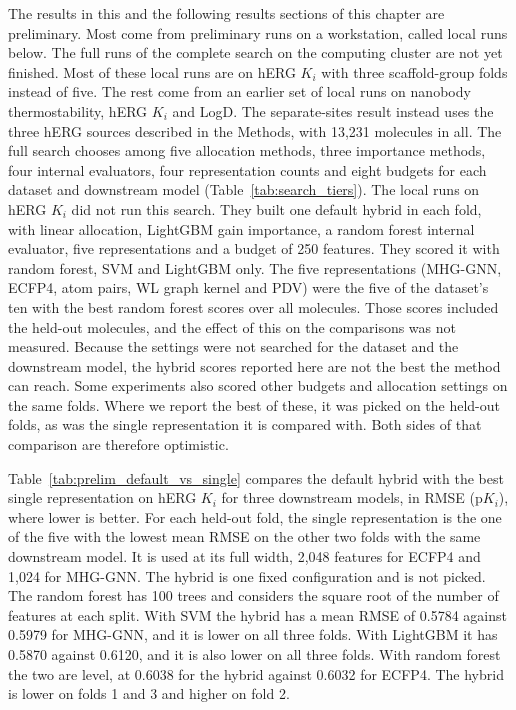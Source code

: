 \label{sec:method:results_single}


The results in this and the following results sections of this chapter are preliminary. Most come from preliminary runs on a workstation, called local runs below. The full runs of the complete search on the computing cluster are not yet finished. Most of these local runs are on hERG $K_i$ with three scaffold-group folds instead of five. The rest come from an earlier set of local runs on nanobody thermostability, hERG $K_i$ and LogD. The separate-sites result instead uses the three hERG sources described in the Methods, with 13,231 molecules in all. The full search chooses among five allocation methods, three importance methods, four internal evaluators, four representation counts and eight budgets for each dataset and downstream model (Table~\ref{tab:search_tiers}). The local runs on hERG $K_i$ did not run this search. They built one default hybrid in each fold, with linear allocation, LightGBM gain importance, a random forest internal evaluator, five representations and a budget of 250 features. They scored it with random forest, SVM and LightGBM only. The five representations (MHG-GNN, ECFP4, atom pairs, WL graph kernel and PDV) were the five of the dataset's ten with the best random forest scores over all molecules. Those scores included the held-out molecules, and the effect of this on the comparisons was not measured. Because the settings were not searched for the dataset and the downstream model, the hybrid scores reported here are not the best the method can reach. Some experiments also scored other budgets and allocation settings on the same folds. Where we report the best of these, it was picked on the held-out folds, as was the single representation it is compared with. Both sides of that comparison are therefore optimistic.

Table~\ref{tab:prelim_default_vs_single} compares the default hybrid with the best single representation on hERG $K_i$ for three downstream models, in RMSE (p$K_i$), where lower is better. For each held-out fold, the single representation is the one of the five with the lowest mean RMSE on the other two folds with the same downstream model. It is used at its full width, 2,048 features for ECFP4 and 1,024 for MHG-GNN. The hybrid is one fixed configuration and is not picked. The random forest has 100 trees and considers the square root of the number of features at each split. With SVM the hybrid has a mean RMSE of 0.5784 against 0.5979 for MHG-GNN, and it is lower on all three folds. With LightGBM it has 0.5870 against 0.6120, and it is also lower on all three folds. With random forest the two are level, at 0.6038 for the hybrid against 0.6032 for ECFP4. The hybrid is lower on folds 1 and 3 and higher on fold 2.

